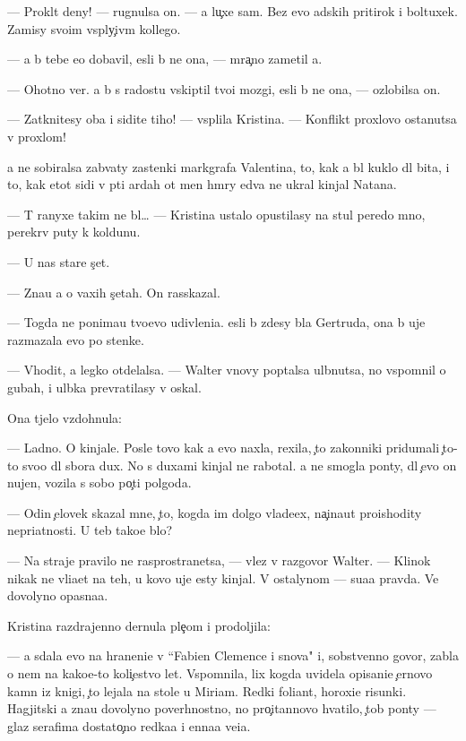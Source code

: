 \documentclass[10pt]{book}
\begin{document}
— Prokl{\ia}t{\yi}{\y} deny! — rugnulsa on. — {\Y}a lu{\c}xe sam. Bez {\y}evo adskih pritirok i boltuxek. Za{\y}misy svo{\y}im vsp{\yi}ly{\c}iv{\yi}m kollego{\y}.

— {\Y}a b{\yi} tebe {\y}e{\x}o dobavil, {\y}esli b{\yi} ne ona, — mra{\c}no zametil {\y}a.

— Ohotno ver{\iu}. {\Y}a b{\yi} s radost{\y}u vskip{\ia}til tvo{\y}i mozgi, {\y}esli b{\yi} ne ona, — ozlobilsa on.

— Zatknitesy oba i sidite tiho! — vsp{\yi}lila Kristina. — Konflikt{\yi} proxlovo ostanutsa v proxlom!

{\Y}a ne sobiralsa zab{\yi}vaty zastenki markgrafa Valentina, to, kak {\y}a b{\yi}l kuklo{\y} dl{\ia} bit{\y}a, i to, kak etot sid{\ia}{\x}i{\y} v p{\ia}ti {\y}ardah ot men{\ia} hm{\yi}ry {\y}edva ne ukral kinjal Natana.

— T{\yi} ranyxe takim ne b{\yi}l… — Kristina ustalo opustilasy na stul peredo mno{\y}, perekr{\yi}v puty k koldunu.

— U nas star{\yi}{\y}e s{\c}et{\yi}.

— Zna{\y}u {\y}a o vaxih s{\c}etah. On rasskazal.

— Togda ne ponima{\y}u tvo{\y}evo udivleni{\y}a. {\Y}esli b{\yi} zdesy b{\yi}la Gertruda, ona b{\yi} uje razmazala {\y}evo po stenke.

— V{\yi}hodit, {\y}a legko otdelalsa. — Walter vnovy pop{\yi}talsa ul{\yi}bnutsa, no vspomnil o gubah, i ul{\yi}bka prevratilasy v oskal.

Ona t{\ia}jelo vzdohnula:

— Ladno. O kinjale. Posle tovo kak {\y}a {\y}evo naxla, rexila, {\c}to zakonniki pridumali {\c}to-to svo{\y}o dl{\ia} sbora dux. No s duxami kinjal ne rabotal. {\Y}a ne smogla pon{\ia}ty, dl{\ia} {\c}evo on nujen, vozila s sobo{\y} po{\c}ti polgoda.

— Odin {\c}elovek skazal mne, {\c}to, kogda im dolgo vlade{\y}ex, na{\c}ina{\y}ut proishodity nepri{\y}atnosti. U teb{\ia} tako{\y}e b{\yi}lo?

— Na straje{\y} pravilo ne rasprostran{\ia}{\y}etsa, — vlez v razgovor Walter. — Klinok nikak ne vli{\y}a{\y}et na teh, u kovo uje {\y}esty kinjal{\yi}. V ostalynom — su{\x}a{\y}a pravda. Ve{\x} dovolyno opasna{\y}a.

Kristina razdrajenno dernula ple{\c}om i prodoljila:

— {\Y}a sdala {\y}evo na hraneni{\y}e v ``Fabien Clemence i s{\yi}nov{\y}a" i, sobstvenno govor{\ia}, zab{\yi}la o nem na kako{\y}e-to koli{\c}estvo let. Vspomnila, lix kogda uvidela opisani{\y}e {\c}ernovo kamn{\ia} iz knigi, {\c}to lejala na stole u Miriam. Redki{\y} foliant, horoxi{\y}e risunki. Hagjitski{\y} {\y}a zna{\y}u dovolyno poverhnostno, no pro{\c}itannovo hvatilo, {\c}tob{\yi} pon{\ia}ty — glaz serafima dostato{\c}no redka{\y}a i {\q}enna{\y}a ve{\x}i{\q}a.
\end{document}
